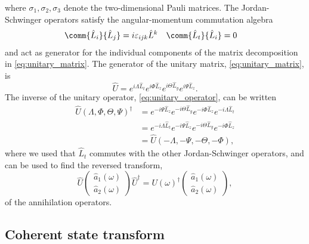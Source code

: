 where $\sigma_1,\sigma_2,\sigma_3$ denote the two-dimensional Pauli matrices.
The Jordan-Schwinger operators satisfy the angular-momentum commutation algebra~\cite[p.~97]{Leonhardt2010}
\begin{align}
	\comm{\hat{L}_i}{\hat{L}_j}
	&=
	i\varepsilon_{ijk}\hat{L}^k
	&
	\comm{\hat{L}_t}{\hat{L}_i}
	&=
	0
\end{align}
and act as generator for the individual components of the matrix decomposition in \cref{eq:unitary_matrix}.
The generator of the unitary matrix, \cref{eq:unitary_matrix}, is
\begin{equation}
	\hat{U}
	=
	e^{i\Lambda\hat{L}_t}
	e^{i\Phi\hat{L}_z}
	e^{i\Theta\hat{L}_y}
	e^{i\Psi\hat{L}_z}
	\label{eq:unitary_operator}
	.
\end{equation}
The inverse of the unitary operator, \cref{eq:unitary_operator}, can be written
\begin{equation}
	\begin{split}
		\hat{U}(\Lambda,\Phi,\Theta,\Psi)^\dagger
		&=
		e^{-i\Psi\hat{L}_z}
		e^{-i\Theta\hat{L}_y}
		e^{-i\Phi\hat{L}_z}
		e^{-i\Lambda\hat{L}_t}
		\\
		&=
		e^{-i\Lambda\hat{L}_t}
		e^{-i\Psi\hat{L}_z}
		e^{-i\Theta\hat{L}_y}
		e^{-i\Phi\hat{L}_z}
		\\
		&=
		\hat{U}(-\Lambda,-\Psi,-\Theta,-\Phi)
		,
	\end{split}
	\label{eq:unitary_operator_inverse}
\end{equation}
where we used that $\hat{L}_t$ commutes with the other Jordan-Schwinger operators, and can be used to find the reversed transform,
\begin{equation}
	\hat{U}
	\begin{pmatrix}
		\hat{a}_1(\omega) \\
		\hat{a}_2(\omega)
	\end{pmatrix}
	\hat{U}^\dagger
	=
	U(\omega)^\dagger
	\begin{pmatrix}
		\hat{a}_1(\omega) \\
		\hat{a}_2(\omega)
	\end{pmatrix}
	\label{eq:unitary_matrix_operator_reverse}
	,
\end{equation}
 of the annihilation operators.

\subsection{Coherent state transform}


